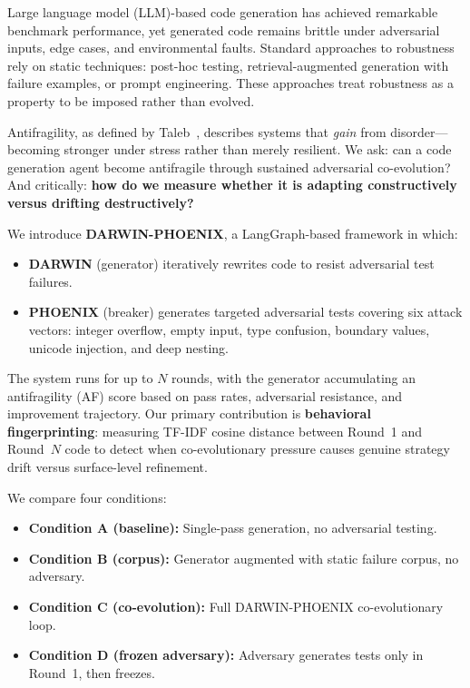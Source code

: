 \documentclass[11pt,letterpaper]{article}
\begin{document}
Large language model (LLM)-based code generation has achieved remarkable
benchmark performance, yet generated code remains brittle under adversarial
inputs, edge cases, and environmental faults. Standard approaches to
robustness rely on static techniques: post-hoc testing, retrieval-augmented
generation with failure examples, or prompt engineering. These approaches
treat robustness as a property to be imposed rather than evolved.

Antifragility, as defined by Taleb~\cite{taleb2012}, describes systems that
\emph{gain} from disorder---becoming stronger under stress rather than merely
resilient. We ask: can a code generation agent become antifragile through
sustained adversarial co-evolution? And critically: \textbf{how do we measure
whether it is adapting constructively versus drifting destructively?}

We introduce \textbf{DARWIN-PHOENIX}, a LangGraph-based framework in which:
\begin{itemize}
  \item \textbf{DARWIN} (generator) iteratively rewrites code to resist
        adversarial test failures.
  \item \textbf{PHOENIX} (breaker) generates targeted adversarial tests
        covering six attack vectors: integer overflow, empty input, type
        confusion, boundary values, unicode injection, and deep nesting.
\end{itemize}

The system runs for up to $N$ rounds, with the generator accumulating an
antifragility (AF) score based on pass rates, adversarial resistance, and
improvement trajectory. Our primary contribution is \textbf{behavioral
fingerprinting}: measuring TF-IDF cosine distance between Round~1 and
Round~$N$ code to detect when co-evolutionary pressure causes genuine strategy
drift versus surface-level refinement.

We compare four conditions:
\begin{itemize}
  \item \textbf{Condition A (baseline):} Single-pass generation, no adversarial
        testing.
  \item \textbf{Condition B (corpus):} Generator augmented with static failure
        corpus, no adversary.
  \item \textbf{Condition C (co-evolution):} Full DARWIN-PHOENIX co-evolutionary
        loop.
  \item \textbf{Condition D (frozen adversary):} Adversary generates tests only
        in Round~1, then freezes.
\end{itemize}
\end{document}
